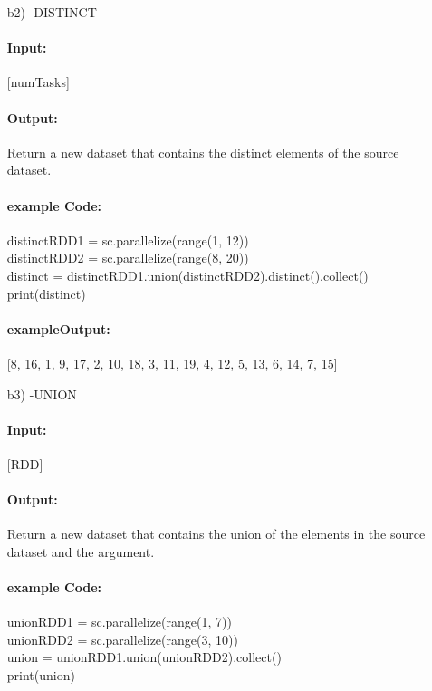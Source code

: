 \documentclass[11pt,a4paper]{scrartcl}
\begin{document}
\begin{itemize}
	\item[b2)]
		-DISTINCT
		\paragraph*{Input:}
		[numTasks]
		
		\paragraph*{Output:}
		Return a new dataset that contains the distinct elements of the source dataset.
		
		\paragraph*{example Code:}
		distinctRDD1 = sc.parallelize(range(1, 12))\\
    		distinctRDD2 = sc.parallelize(range(8, 20))\\
    		distinct = distinctRDD1.union(distinctRDD2).distinct().collect()\\
    		print(distinct)\\
		
		\paragraph*{exampleOutput:}
		[8, 16, 1, 9, 17, 2, 10, 18, 3, 11, 19, 4, 12, 5, 13, 6, 14, 7, 15]
		
	\item[b3)]
		-UNION
		\paragraph*{Input:}
		[RDD]
		
		\paragraph*{Output:}
		Return a new dataset that contains the union of the elements in the source dataset and the argument.
		
		\paragraph*{example Code:}
		unionRDD1 = sc.parallelize(range(1, 7))\\
    		unionRDD2 = sc.parallelize(range(3, 10))\\
    		union = unionRDD1.union(unionRDD2).collect()\\
    		print(union)\\
		

\end{itemize}
\end{document}

